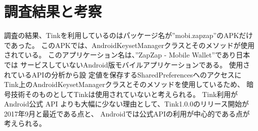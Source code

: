 \newpage
\section{調査結果と考察}
調査の結果、Tinkを利用しているのはパッケージ名が”mobi.zapzap”のAPKだけであった。
このAPKでは、AndroidKeysetManagerクラスとそのメソッドが使用されている。
このアプリケーション名は、”ZapZap - Mobile Wallet”\cite{}であり日本では
サービスしていないAndroid版モバイルアプリケーションである。
使用されているAPIの分析から設
定値を保存するSharedPreferencesへのアクセスにTink上のAndroidKeysetManagerクラスとそのメソッドを使用しているため、
暗号技術そのものとしてTinkは使用されていないと考えられる。
Tink利用がAndroid公式 API よりも大幅に少ない理由として、Tink1.0.0のリリース開始が2017年9月と最近である点と、
Androidでは公式APIの利用が中心的である点が考えられる。
